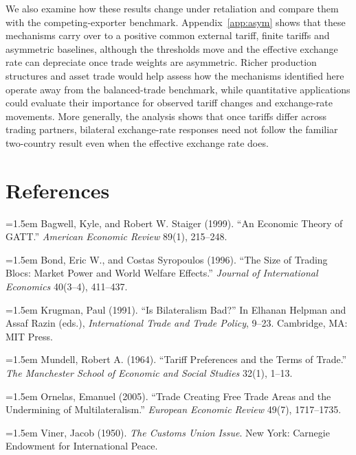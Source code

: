 \documentclass[11pt]{article}
\begin{document}
We also examine how these results change under retaliation and compare them with the competing-exporter benchmark. Appendix~\ref{app:asym} shows that these mechanisms carry over to a positive common external tariff, finite tariffs and asymmetric baselines, although the thresholds move and the effective exchange rate can depreciate once trade weights are asymmetric. Richer production structures and asset trade would help assess how the mechanisms identified here operate away from the balanced-trade benchmark, while quantitative applications could evaluate their importance for observed tariff changes and exchange-rate movements. More generally, the analysis shows that once tariffs differ across trading partners, bilateral exchange-rate responses need not follow the familiar two-country result even when the effective exchange rate does.

\section*{References}

\begingroup
\setlength{\parindent}{0pt}
\newcommand{\refentry}[1]{\par\hangindent=1.5em #1\par\vspace{2pt}}

\refentry{Bagwell, Kyle, and Robert W. Staiger (1999). ``An Economic Theory of GATT.'' \emph{American Economic Review} 89(1), 215--248.}

\refentry{Bond, Eric W., and Costas Syropoulos (1996). ``The Size of Trading Blocs: Market Power and World Welfare Effects.'' \emph{Journal of International Economics} 40(3--4), 411--437.}

\refentry{Krugman, Paul (1991). ``Is Bilateralism Bad?'' In Elhanan Helpman and Assaf Razin (eds.), \emph{International Trade and Trade Policy}, 9--23. Cambridge, MA: MIT Press.}

\refentry{Mundell, Robert A. (1964). ``Tariff Preferences and the Terms of Trade.'' \emph{The Manchester School of Economic and Social Studies} 32(1), 1--13.}

\refentry{Ornelas, Emanuel (2005). ``Trade Creating Free Trade Areas and the Undermining of Multilateralism.'' \emph{European Economic Review} 49(7), 1717--1735.}

\refentry{Viner, Jacob (1950). \emph{The Customs Union Issue}. New York: Carnegie Endowment for International Peace.}

\endgroup
\end{document}
